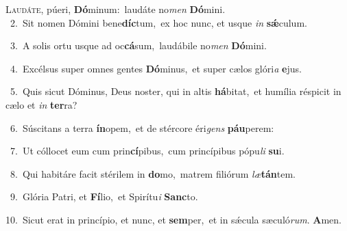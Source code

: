 \lettrine{\initial\textcolor{\initialcolor}{L}}{audáte,} púeri, \textbf{Dó}\-minum:~\star laudáte no\textit{men} \textbf{Dó}\-mini.\\
{\numbfont\textcolor{\numbcolor}{~2.}}~Sit nomen Dómini bene\-\textbf{díc}\-tum,~\star ex hoc nunc, et usque \textit{in} \textbf{sǽ}\-culum.\par
{\numbfont\textcolor{\numbcolor}{~3.}}~A solis ortu usque ad oc\-\textbf{cá}\-sum,~\star laudábile no\textit{men} \textbf{Dó}\-mini.\par
{\numbfont\textcolor{\numbcolor}{~4.}}~Excélsus super omnes gentes \textbf{Dó}\-minus,~\star et super cælos glóri\textit{a} \textbf{e}\-jus.\par
{\numbfont\textcolor{\numbcolor}{~5.}}~Quis sicut Dóminus, Deus noster, qui in altis \textbf{há}\-bitat,~\star et humília réspicit in cælo et \textit{in} \textbf{ter}\-ra?\par
{\numbfont\textcolor{\numbcolor}{~6.}}~Súscitans a terra \textbf{ín}\-opem,~\star et de stércore éri\textit{gens} \textbf{páu}\-perem:\par
{\numbfont\textcolor{\numbcolor}{~7.}}~Ut cóllocet eum cum prin\-\textbf{cí}\-pibus,~\star cum princípibus pópu\textit{li} \textbf{su}\-i.\par
{\numbfont\textcolor{\numbcolor}{~8.}}~Qui habitáre facit stérilem in \textbf{do}\-mo,~\star matrem filiórum \textit{læ}\-\textbf{tán}tem.\par
{\numbfont\textcolor{\numbcolor}{~9.}}~Glória Patri, et \textbf{Fí}\-lio,~\star et Spirítu\textit{i} \textbf{Sanc}\-to.\par
{\numbfont\textcolor{\numbcolor}{10.}}~Sicut erat in princípio, et nunc, et \textbf{sem}\-per,~\star et in sǽcula sæculó\-\textit{rum}\-. \textbf{A}\-men.\par
